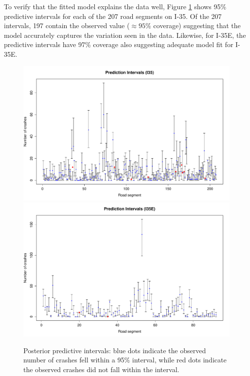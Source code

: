 To verify that the fitted model explains the data well, Figure \ref{predictive} shows 95\% predictive intervals for each of the 207 road segments on I-35. Of the 207 intervals, 197 contain the observed value ($\approx 95\%$ coverage) suggesting that the model accurately captures the variation seen in the data.  Likewise, for I-35E, the predictive intervals have 97\% coverage also suggesting adequate model fit for I-35E.
\begin{figure}[h]
\centering
\includegraphics[width=.9\textwidth]{predictive.pdf}
\includegraphics[width=.9\textwidth]{predictive35e.pdf}
\caption{Posterior predictive intervals: blue dots indicate the observed number of crashes fell within a 95\% interval, while red dots indicate the observed crashes did not fall within the interval.}
\label{predictive}
\end{figure}


